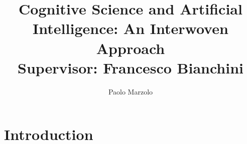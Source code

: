 \documentclass{article}
\title{Cognitive Science and Artificial Intelligence: An Interwoven Approach \\
\large Supervisor: Francesco Bianchini}
\author{Paolo Marzolo}
\begin{document}
\maketitle

\section{Introduction}


\end{document}
